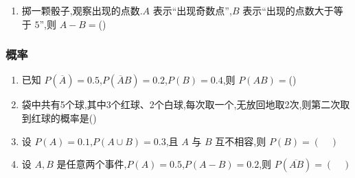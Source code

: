 \begin{enumerate}
    \item  掷一颗骰子,观察出现的点数.$A$ 表示“出现奇数点”,$B$ 表示“出现的点数大于等于 $5$”,则 $A-B=$(\quad)
\end{enumerate}

\subsubsection{概率}

\begin{enumerate}
    \item  已知 $P(\overline{A})=0.5$,$P(\overline{A}B)=0.2$,$P(B)=0.4$,则 $P(AB)=$(\quad)

    \item  袋中共有5个球,其中3个红球、2个白球,每次取一个,无放回地取2次,则第二次取到红球的概率是(\quad)

    \item  设 $P(A)=0.1$,$P(A\cup B)=0.3$,且 $A$ 与 $B$ 互不相容,则 $P(B)=(\quad)$

    \item  设 $A,B$ 是任意两个事件,$P(A)=0.5$,$P(A-B)=0.2$,则 $P(\overline{AB})=(\quad)$


\end{enumerate}
